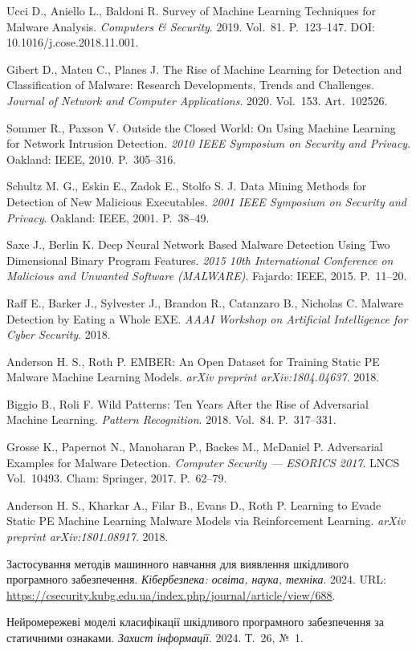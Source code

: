 
 Ucci D., Aniello L., Baldoni R. Survey of Machine Learning Techniques for Malware Analysis. \emph{Computers \& Security}. 2019. Vol.~81. P.~123--147. DOI: 10.1016/j.cose.2018.11.001.

 Gibert D., Mateu C., Planes J. The Rise of Machine Learning for Detection and Classification of Malware: Research Developments, Trends and Challenges. \emph{Journal of Network and Computer Applications}. 2020. Vol.~153. Art.~102526.

 Sommer R., Paxson V. Outside the Closed World: On Using Machine Learning for Network Intrusion Detection. \emph{2010 IEEE Symposium on Security and Privacy}. Oakland: IEEE, 2010. P.~305--316.

 Schultz M. G., Eskin E., Zadok E., Stolfo S. J. Data Mining Methods for Detection of New Malicious Executables. \emph{2001 IEEE Symposium on Security and Privacy}. Oakland: IEEE, 2001. P.~38--49.

 Saxe J., Berlin K. Deep Neural Network Based Malware Detection Using Two Dimensional Binary Program Features. \emph{2015 10th International Conference on Malicious and Unwanted Software (MALWARE)}. Fajardo: IEEE, 2015. P.~11--20.

 Raff E., Barker J., Sylvester J., Brandon R., Catanzaro B., Nicholas C. Malware Detection by Eating a Whole EXE. \emph{AAAI Workshop on Artificial Intelligence for Cyber Security}. 2018.

 Anderson H. S., Roth P. EMBER: An Open Dataset for Training Static PE Malware Machine Learning Models. \emph{arXiv preprint arXiv:1804.04637}. 2018.

 Biggio B., Roli F. Wild Patterns: Ten Years After the Rise of Adversarial Machine Learning. \emph{Pattern Recognition}. 2018. Vol.~84. P.~317--331.

 Grosse K., Papernot N., Manoharan P., Backes M., McDaniel P. Adversarial Examples for Malware Detection. \emph{Computer Security --- ESORICS 2017}. LNCS Vol.~10493. Cham: Springer, 2017. P.~62--79.

 Anderson H. S., Kharkar A., Filar B., Evans D., Roth P. Learning to Evade Static PE Machine Learning Malware Models via Reinforcement Learning. \emph{arXiv preprint arXiv:1801.08917}. 2018.

 Застосування методів машинного навчання для виявлення шкідливого програмного забезпечення. \emph{Кібербезпека: освіта, наука, техніка}. 2024. URL: \url{https://csecurity.kubg.edu.ua/index.php/journal/article/view/688}.

 Нейромережеві моделі класифікації шкідливого програмного забезпечення за статичними ознаками. \emph{Захист інформації}. 2024. Т.~26, №~1.
